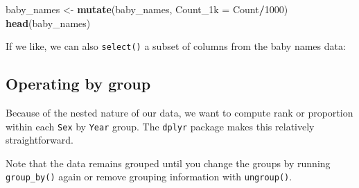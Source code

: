 \documentclass[]{book}
\newenvironment{Shaded}{\begin{snugshade}}{\end{snugshade}}
\newcommand{\KeywordTok}[1]{\textcolor[rgb]{0.13,0.29,0.53}{\textbf{#1}}}
\newcommand{\DataTypeTok}[1]{\textcolor[rgb]{0.13,0.29,0.53}{#1}}
\newcommand{\DecValTok}[1]{\textcolor[rgb]{0.00,0.00,0.81}{#1}}
\newcommand{\StringTok}[1]{\textcolor[rgb]{0.31,0.60,0.02}{#1}}
\newcommand{\OperatorTok}[1]{\textcolor[rgb]{0.81,0.36,0.00}{\textbf{#1}}}
\newcommand{\NormalTok}[1]{#1}
\begin{document}
\begin{Shaded}
\begin{Highlighting}[]
\NormalTok{baby_names <-}\StringTok{ }\KeywordTok{mutate}\NormalTok{(baby_names, }\DataTypeTok{Count_1k =}\NormalTok{ Count}\OperatorTok{/}\DecValTok{1000}\NormalTok{)}
\KeywordTok{head}\NormalTok{(baby_names) }
\end{Highlighting}
\end{Shaded}

If we like, we can also \texttt{select()} a subset of columns from the
baby names data:

\begin{Shaded}
\end{Shaded}

\subsection{Operating by group}\label{operating-by-group}

Because of the nested nature of our data, we want to compute rank or
proportion within each \texttt{Sex} by \texttt{Year} group. The
\texttt{dplyr} package makes this relatively straightforward.

\begin{Shaded}
\end{Shaded}

Note that the data remains grouped until you change the groups by
running \texttt{group\_by()} again or remove grouping information with
\texttt{ungroup()}.
\end{document}
